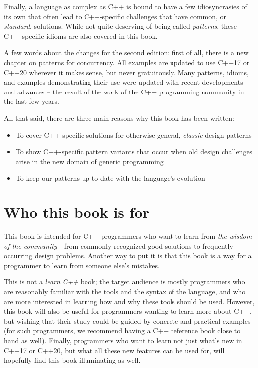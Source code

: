 Finally, a language as complex as C++ is bound to have a few idiosyncrasies of its own that often lead to C++-specific challenges that have common, or \emph{standard}, solutions. While not quite deserving of being called \emph{patterns}, these C++-specific idioms are also covered in this book.

A few words about the changes for the second edition: first of all, there is a new chapter on patterns for concurrency. All examples are updated to use C++17 or C++20 wherever it makes sense, but never gratuitously. Many patterns, idioms, and examples demonstrating their use were updated with recent developments and advances -- the result of the work of the C++ programming community in the last few years.

All that said, there are three main reasons why this book has been written:

\begin{itemize}
\tightlist
\item
  To cover C++-specific solutions for otherwise general, \emph{classic} design patterns
\item
  To show C++-specific pattern variants that occur when old design challenges arise in the new domain of generic programming
\item
  To keep our patterns up to date with the language's evolution
\end{itemize}

\section{Who this book is for}

This book is intended for C++ programmers who want to learn from \emph{the wisdom of the community}---from commonly-recognized good solutions to frequently occurring design problems. Another way to put it is that this book is a way for a programmer to learn from someone else's mistakes.

This is not a \emph{learn} \emph{C++} book; the target audience is mostly programmers who are reasonably familiar with the tools and the syntax of the language, and who are more interested in learning how and why these tools should be used. However, this book will also be useful for programmers wanting to learn more about C++, but wishing that their study could be guided by concrete and practical examples (for such programmers, we recommend having a C++ reference book close to hand as well). Finally, programmers who want to learn not just what's new in C++17 or C++20, but what all these new features can be used for, will hopefully find this book illuminating as well.

